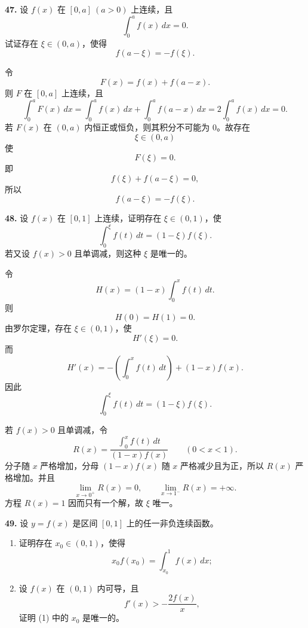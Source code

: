 \begin{problemblock}
\textbf{47.} 设 \(f(x)\) 在 \([0,a]\ (a>0)\) 上连续，且
\[
\int_0^a f(x)\,dx=0.
\]
试证存在 \(\xi\in(0,a)\)，使得
\[
f(a-\xi)=-f(\xi).
\]
\end{problemblock}

\begin{solutionblock}
令
\[
F(x)=f(x)+f(a-x).
\]
则 \(F\) 在 \([0,a]\) 上连续，且
\[
\int_0^aF(x)\,dx
=\int_0^af(x)\,dx+\int_0^af(a-x)\,dx
=2\int_0^af(x)\,dx=0.
\]
若 \(F(x)\) 在 \((0,a)\) 内恒正或恒负，则其积分不可能为 \(0\)。故存在
\[
\xi\in(0,a)
\]
使
\[
F(\xi)=0.
\]
即
\[
f(\xi)+f(a-\xi)=0,
\]
所以
\[
f(a-\xi)=-f(\xi).
\]
\end{solutionblock}

\begin{problemblock}
\textbf{48.} 设 \(f(x)\) 在 \([0,1]\) 上连续，证明存在 \(\xi\in(0,1)\)，使
\[
\int_0^\xi f(t)\,dt=(1-\xi)f(\xi).
\]
若又设 \(f(x)>0\) 且单调减，则这种 \(\xi\) 是唯一的。
\end{problemblock}

\begin{solutionblock}
令
\[
H(x)=(1-x)\int_0^xf(t)\,dt.
\]
则
\[
H(0)=H(1)=0.
\]
由罗尔定理，存在 \(\xi\in(0,1)\)，使
\[
H'(\xi)=0.
\]
而
\[
H'(x)=-(\int_0^xf(t)\,dt)+(1-x)f(x).
\]
因此
\[
\int_0^\xi f(t)\,dt=(1-\xi)f(\xi).
\]

若 \(f(x)>0\) 且单调减，令
\[
R(x)=\frac{\int_0^x f(t)\,dt}{(1-x)f(x)}\qquad(0<x<1).
\]
分子随 \(x\) 严格增加，分母 \((1-x)f(x)\) 随 \(x\) 严格减少且为正，所以 \(R(x)\) 严格增加。并且
\[
\lim_{x\to0^+}R(x)=0,\qquad \lim_{x\to1^-}R(x)=+\infty.
\]
方程 \(R(x)=1\) 因而只有一个解，故 \(\xi\) 唯一。
\end{solutionblock}

\begin{problemblock}
\textbf{49.} 设 \(y=f(x)\) 是区间 \([0,1]\) 上的任一非负连续函数。
\begin{enumerate}
\item 证明存在 \(x_0\in(0,1)\)，使得
\[
x_0f(x_0)=\int_{x_0}^1f(x)\,dx;
\]
\item 设 \(f(x)\) 在 \((0,1)\) 内可导，且
\[
f'(x)>-\frac{2f(x)}{x},
\]
证明 (1) 中的 \(x_0\) 是唯一的。
\end{enumerate}
\end{problemblock}

